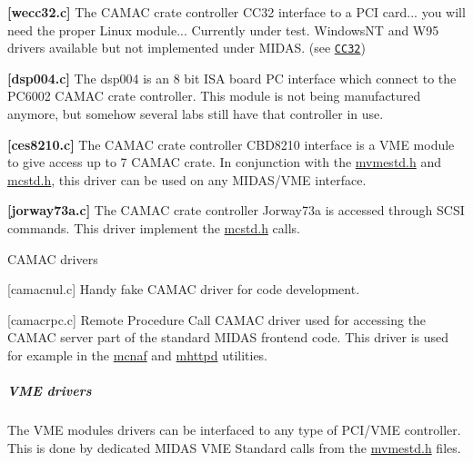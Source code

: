\begin{DoxyItemize}
\begin{DoxyItemize}
\item {\bfseries \mbox{[}wecc32.c\mbox{]}} The CAMAC crate controller CC32 interface to a PCI card... you will need the proper Linux module... Currently under test. WindowsNT and W95 drivers available but not implemented under MIDAS. (see \href{http://www.wiener-d.com/cc32.htm}{\tt CC32})
\item {\bfseries \mbox{[}dsp004.c\mbox{]}} The dsp004 is an 8 bit ISA board PC interface which connect to the PC6002 CAMAC crate controller. This module is not being manufactured anymore, but somehow several labs still have that controller in use.
\item {\bfseries \mbox{[}ces8210.c\mbox{]}} The CAMAC crate controller CBD8210 interface is a VME module to give access up to 7 CAMAC crate. In conjunction with the \hyperlink{mvmestd_8h}{mvmestd.h} and \hyperlink{mcstd_8h}{mcstd.h}, this driver can be used on any MIDAS/VME interface.
\item {\bfseries \mbox{[}jorway73a.c\mbox{]}} The CAMAC crate controller Jorway73a is accessed through SCSI commands. This driver implement the \hyperlink{mcstd_8h}{mcstd.h} calls.
\end{DoxyItemize}
\end{DoxyItemize}


\begin{DoxyItemize}
\item CAMAC drivers
\begin{DoxyItemize}
\item {\bfseries }\mbox{[}camacnul.c\mbox{]} Handy fake CAMAC driver for code development.
\item {\bfseries }\mbox{[}camacrpc.c\mbox{]} Remote Procedure Call CAMAC driver used for accessing the CAMAC server part of the standard MIDAS frontend code. This driver is used for example in the \hyperlink{FE_utils_FE_mcnaf_utility}{mcnaf} and \hyperlink{RC_mhttpd_utility}{mhttpd} utilities.
\end{DoxyItemize}
\end{DoxyItemize}

\label{FE_Hardware_idx_Hardware_drivers_VME}
\hypertarget{FE_Hardware_idx_Hardware_drivers_VME}{}
 

 \hypertarget{FE_Hardware_VME_drivers}{}\subparagraph{VME drivers}\label{FE_Hardware_VME_drivers}
The VME modules drivers can be interfaced to any type of PCI/VME controller. This is done by dedicated MIDAS VME Standard calls from the \hyperlink{mvmestd_8h}{mvmestd.h} files.


